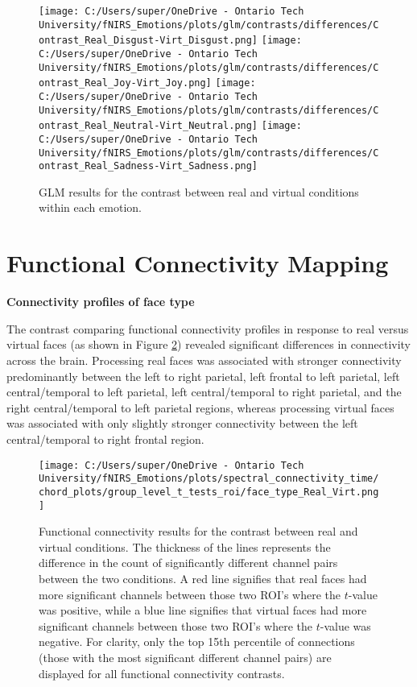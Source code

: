 \begin{figure}[H]
  \centering
  \texttt{[image: C:/Users/super/OneDrive - Ontario Tech University/fNIRS\_Emotions/plots/glm/contrasts/differences/Contrast\_Real\_Disgust-Virt\_Disgust.png]}
  \texttt{[image: C:/Users/super/OneDrive - Ontario Tech University/fNIRS\_Emotions/plots/glm/contrasts/differences/Contrast\_Real\_Joy-Virt\_Joy.png]}
  \texttt{[image: C:/Users/super/OneDrive - Ontario Tech University/fNIRS\_Emotions/plots/glm/contrasts/differences/Contrast\_Real\_Neutral-Virt\_Neutral.png]}
  \texttt{[image: C:/Users/super/OneDrive - Ontario Tech University/fNIRS\_Emotions/plots/glm/contrasts/differences/Contrast\_Real\_Sadness-Virt\_Sadness.png]}
  \caption[GLM: Face Type \texorpdfstring{$\times$}{x} Emotion Contrasts]{GLM results for the contrast between real and virtual conditions within each emotion.}
  \label{fig:glm_real_vs_virtual_emotion_analysis}
\end{figure}

\section{Functional Connectivity Mapping}
\noindent
\textbf{Connectivity profiles of face type}

The contrast comparing functional connectivity profiles in response to real versus virtual faces (as shown in Figure \ref{fig:fc_real_vs_virtual}) revealed significant differences in connectivity across the brain. 
Processing real faces was associated with stronger connectivity predominantly between the left to right parietal, left frontal to left parietal, left central/temporal to left parietal, left central/temporal to right parietal, and the right central/temporal to left parietal regions, whereas processing virtual faces was associated with only slightly stronger connectivity between the left central/temporal to right frontal region. 

\begin{figure}[H]
  \centering
  \texttt{[image: C:/Users/super/OneDrive - Ontario Tech University/fNIRS\_Emotions/plots/spectral\_connectivity\_time/chord\_plots/group\_level\_t\_tests\_roi/face\_type\_Real\_Virt.png]}
  \caption[FC: Real vs. Virtual]{Functional connectivity results for the contrast between real and virtual conditions.
  The thickness of the lines represents the difference in the count of significantly different channel pairs between the two conditions. 
  A red line signifies that real faces had more significant channels between those two ROI's where the $t$-value was positive, while a blue line signifies that virtual faces had more significant channels between those two ROI's where the $t$-value was negative.
  For clarity, only the top 15th percentile of connections (those with the most significant different channel pairs) are displayed for all functional connectivity contrasts.}
  \label{fig:fc_real_vs_virtual}
\end{figure}

